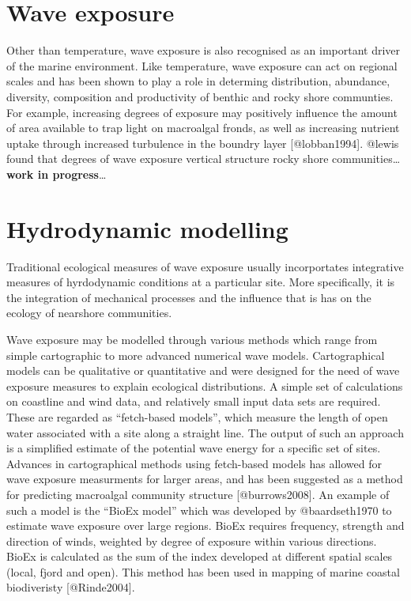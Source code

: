 \documentclass[]{article}
\begin{document}
\section{Wave exposure}\label{wave-exposure}

Other than temperature, wave exposure is also recognised as an important
driver of the marine environment. Like temperature, wave exposure can
act on regional scales and has been shown to play a role in determing
distribution, abundance, diversity, composition and productivity of
benthic and rocky shore communties. For example, increasing degrees of
exposure may positively influence the amount of area available to trap
light on macroalgal fronds, as well as increasing nutrient uptake
through increased turbulence in the boundry layer {[}@lobban1994{]}.
@lewis found that degrees of wave exposure vertical structure rocky
shore communities\ldots{}\textbf{work in progress}\ldots{}

\section{Hydrodynamic modelling}\label{hydrodynamic-modelling}

Traditional ecological measures of wave exposure usually incorportates
integrative measures of hyrdodynamic conditions at a particular site.
More specifically, it is the integration of mechanical processes and the
influence that is has on the ecology of nearshore communities.

Wave exposure may be modelled through various methods which range from
simple cartographic to more advanced numerical wave models.
Cartographical models can be qualitative or quantitative and were
designed for the need of wave exposure measures to explain ecological
distributions. A simple set of calculations on coastline and wind data,
and relatively small input data sets are required. These are regarded as
``fetch-based models'', which measure the length of open water
associated with a site along a straight line. The output of such an
approach is a simplified estimate of the potential wave energy for a
specific set of sites. Advances in cartographical methods using
fetch-based models has allowed for wave exposure measurments for larger
areas, and has been suggested as a method for predicting macroalgal
community structure {[}@burrows2008{]}. An example of such a model is
the ``BioEx model'' which was developed by @baardseth1970 to estimate
wave exposure over large regions. BioEx requires frequency, strength and
direction of winds, weighted by degree of exposure within various
directions. BioEx is calculated as the sum of the index developed at
different spatial scales (local, fjord and open). This method has been
used in mapping of marine coastal biodiveristy {[}@Rinde2004{]}.
\end{document}
